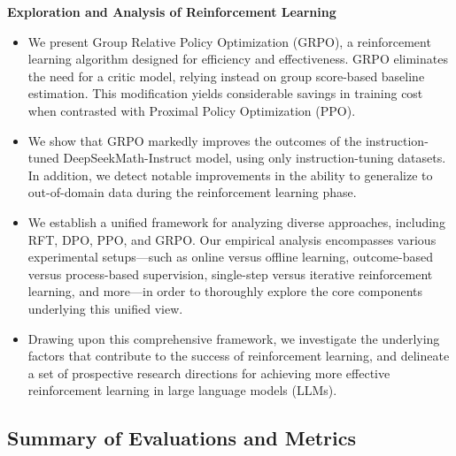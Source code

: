 \textbf{Exploration and Analysis of Reinforcement Learning}

\begin{itemize}[topsep=0pt]
    \item We present Group Relative Policy Optimization (GRPO), a reinforcement learning algorithm designed for efficiency and effectiveness. GRPO eliminates the need for a critic model, relying instead on group score-based baseline estimation. This modification yields considerable savings in training cost when contrasted with Proximal Policy Optimization (PPO).
    \item We show that GRPO markedly improves the outcomes of the instruction-tuned DeepSeekMath-Instruct model, using only instruction-tuning datasets. In addition, we detect notable improvements in the ability to generalize to out-of-domain data during the reinforcement learning phase.
    \item We establish a unified framework for analyzing diverse approaches, including RFT, DPO, PPO, and GRPO. Our empirical analysis encompasses various experimental setups—such as online versus offline learning, outcome-based versus process-based supervision, single-step versus iterative reinforcement learning, and more—in order to thoroughly explore the core components underlying this unified view.
    \item Drawing upon this comprehensive framework, we investigate the underlying factors that contribute to the success of reinforcement learning, and delineate a set of prospective research directions for achieving more effective reinforcement learning in large language models (LLMs).
\end{itemize}

\subsection{Summary of Evaluations and Metrics}

